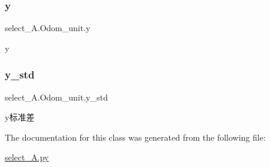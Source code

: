 \subsubsection{\texorpdfstring{y}{y}}
{\footnotesize\ttfamily select\+\_\+\+A.\+Odom\+\_\+unit.\+y}



y 

\mbox{\label{classselect___a_1_1_odom__unit_a61b76aa36fddf1c7238113d4bd77e6fa}} 
\subsubsection{\texorpdfstring{y\+\_\+std}{y\_std}}
{\footnotesize\ttfamily select\+\_\+\+A.\+Odom\+\_\+unit.\+y\+\_\+std}



y标准差 



The documentation for this class was generated from the following file\+:\begin{DoxyCompactItemize}
\item 
\hyperlink{select___a_8py}{select\+\_\+\+A.\+py}\end{DoxyCompactItemize}
